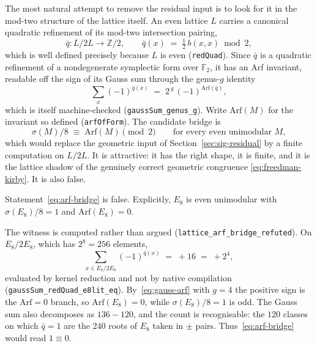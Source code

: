 The most natural attempt to remove the residual input is to look for it in
the mod-two structure of the lattice itself. An even lattice $L$ carries a
canonical quadratic refinement of its mod-two intersection pairing,
\begin{equation}
\bar q : L/2L \longrightarrow \mathbb{Z}/2,
\qquad
\bar q(x) \;=\; \tfrac{1}{2}\,b(x,x) \bmod 2 ,
\label{eq:redquad}
\end{equation}
which is well defined precisely because $L$ is even
(\texttt{redQuad}). Since $\bar q$ is a quadratic refinement of a
nondegenerate symplectic form over $\mathbb{F}_2$, it has an Arf
invariant, readable off the sign of its Gauss sum through the genus-$g$
identity
\begin{equation}
\sum_{x} (-1)^{\bar q(x)} \;=\; 2^{\,g}\,(-1)^{\mathrm{Arf}(\bar q)} ,
\label{eq:gauss-arf}
\end{equation}
which is itself machine-checked (\texttt{gaussSum\_genus\_g}). Write
$\mathrm{Arf}(M)$ for the invariant so defined
(\texttt{arfOfForm}). The candidate bridge is
\begin{equation}
\sigma(M)/8 \;\equiv\; \mathrm{Arf}(M) \pmod 2
\qquad\text{for every even unimodular } M ,
\label{eq:arf-bridge}
\end{equation}
which would replace the geometric input of
Section~\ref{sec:sig-residual} by a finite computation on $L/2L$. It is
attractive: it has the right shape, it is finite, and it is the lattice
shadow of the genuinely correct geometric congruence
\eqref{eq:freedman-kirby}. It is also false.

\begin{theorem}
\label{thm:arf-nogo}
Statement~\eqref{eq:arf-bridge} is false. Explicitly, $E_8$ is even
unimodular with $\sigma(E_8)/8 = 1$ and $\mathrm{Arf}(E_8) = 0$.
\end{theorem}

The witness is computed rather than argued
(\texttt{lattice\_arf\_bridge\_refuted}). On $E_8/2E_8$, which has
$2^8 = 256$ elements,
\begin{equation}
\sum_{x \in E_8/2E_8} (-1)^{\bar q(x)} \;=\; +16 \;=\; +2^4 ,
\label{eq:e8-gauss}
\end{equation}
evaluated by kernel reduction and not by native compilation
(\texttt{gaussSum\_redQuad\_e8lit\_eq}). By~\eqref{eq:gauss-arf} with
$g=4$ the positive sign is the $\mathrm{Arf} = 0$ branch, so
$\mathrm{Arf}(E_8) = 0$, while $\sigma(E_8)/8 = 1$ is odd. The Gauss sum
also decomposes as $136 - 120$, and the count is recognisable: the $120$
classes on which $\bar q = 1$ are the $240$ roots of $E_8$ taken in
$\pm$ pairs. Thus~\eqref{eq:arf-bridge} would read $1 \equiv 0$.

